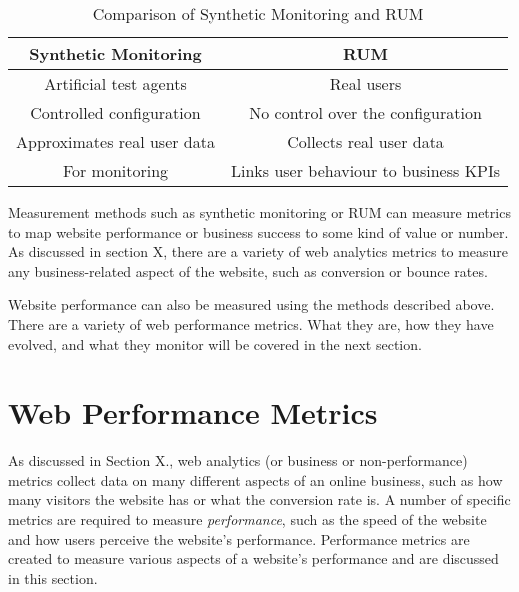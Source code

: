 \begin{table}[h]
	\small
	\centering
	\begin{tabular}{ | c | c | }
	\hline
	Synthetic Monitoring \cellcolor{lightgrey} & RUM \cellcolor{lightgrey} \\
	\hline
	Artificial test agents & Real users \\
	\hline
	Controlled configuration & No control over the configuration \\
	\hline
	Approximates real user data & Collects real user data \\
	\hline
	For monitoring & Links user behaviour to business KPIs \\
	\hline
	\end{tabular}
	\medskip
	\caption{Comparison of Synthetic Monitoring and RUM}
	\label{table:synthetic_monitoring_rum_comparison}
\end{table}


Measurement methods such as synthetic monitoring or RUM can measure metrics to map website performance or business success to some kind of value or number.
As discussed in section X, there are a variety of web analytics metrics to measure any business-related aspect of the website, such as conversion or bounce rates.

Website performance can also be measured using the methods described above.
There are a variety of web performance metrics.
What they are, how they have evolved, and what they monitor will be covered in the next section.



\section{Web Performance Metrics} %
\label{section:web_performance_metrics}



As discussed in Section X., web analytics (or business or non-performance) metrics collect data on many different aspects of an online business, such as how many visitors the website has or what the conversion rate is.
A number of specific metrics are required to measure \textit{performance}, such as the speed of the website and how users perceive the website's performance.
Performance metrics are created to measure various aspects of a website's performance and are discussed in this section.


